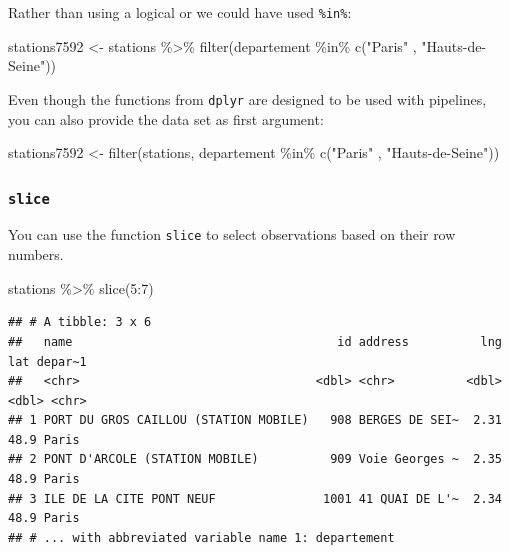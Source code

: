 \documentclass[
]{book}
\newenvironment{Shaded}{\begin{snugshade}}{\end{snugshade}}
\newcommand{\DecValTok}[1]{\textcolor[rgb]{0.00,0.00,0.81}{#1}}
\newcommand{\FunctionTok}[1]{\textcolor[rgb]{0.00,0.00,0.00}{#1}}
\newcommand{\NormalTok}[1]{#1}
\newcommand{\OtherTok}[1]{\textcolor[rgb]{0.56,0.35,0.01}{#1}}
\newcommand{\SpecialCharTok}[1]{\textcolor[rgb]{0.00,0.00,0.00}{#1}}
\newcommand{\StringTok}[1]{\textcolor[rgb]{0.31,0.60,0.02}{#1}}
\begin{document}
Rather than using a logical or we could have used \texttt{\%in\%}:

\begin{Shaded}
\begin{Highlighting}[]
\NormalTok{stations7592 }\OtherTok{\textless{}{-}}\NormalTok{ stations }\SpecialCharTok{\%\textgreater{}\%}
                  \FunctionTok{filter}\NormalTok{(departement }\SpecialCharTok{\%in\%} \FunctionTok{c}\NormalTok{(}\StringTok{"Paris"}\NormalTok{ , }\StringTok{"Hauts{-}de{-}Seine"}\NormalTok{))}
\end{Highlighting}
\end{Shaded}

Even though the functions from \texttt{dplyr} are designed to be used with pipelines, you can also provide the data set as first argument:

\begin{Shaded}
\begin{Highlighting}[]
\NormalTok{stations7592 }\OtherTok{\textless{}{-}} \FunctionTok{filter}\NormalTok{(stations, departement }\SpecialCharTok{\%in\%} \FunctionTok{c}\NormalTok{(}\StringTok{"Paris"}\NormalTok{ , }\StringTok{"Hauts{-}de{-}Seine"}\NormalTok{))}
\end{Highlighting}
\end{Shaded}

\hypertarget{slice}{%
\subsubsection{\texorpdfstring{\texttt{slice}}{slice}}\label{slice}}

You can use the function \texttt{slice} to select observations based on their row numbers.

\begin{Shaded}
\begin{Highlighting}[]
\NormalTok{stations }\SpecialCharTok{\%\textgreater{}\%}
  \FunctionTok{slice}\NormalTok{(}\DecValTok{5}\SpecialCharTok{:}\DecValTok{7}\NormalTok{)}
\end{Highlighting}
\end{Shaded}

\begin{verbatim}
## # A tibble: 3 x 6
##   name                                     id address          lng   lat depar~1
##   <chr>                                 <dbl> <chr>          <dbl> <dbl> <chr>  
## 1 PORT DU GROS CAILLOU (STATION MOBILE)   908 BERGES DE SEI~  2.31  48.9 Paris  
## 2 PONT D'ARCOLE (STATION MOBILE)          909 Voie Georges ~  2.35  48.9 Paris  
## 3 ILE DE LA CITE PONT NEUF               1001 41 QUAI DE L'~  2.34  48.9 Paris  
## # ... with abbreviated variable name 1: departement
\end{verbatim}
\end{document}
